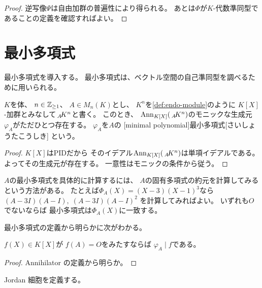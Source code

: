 \documentclass[report]{jlreq}
\begin{document}
\begin{proof}
    逆写像$\Psi$は自由加群の普遍性により得られる。
    あとは$\Phi$が$K$-代数準同型であることの定義を確認すればよい。
    \TODO{}
\end{proof}

%
\section{最小多項式}

最小多項式を導入する。
最小多項式は、ベクトル空間の自己準同型を調べるために用いられる。

\begin{propdef}[最小多項式]
    $K$を体、
    $n \in \mathbb{Z}_{\ge 1}$、
    $A \in M_n(K)$とし、
    $K^n$を\cref{def:endo-module}のように
    $K[X]$-加群とみなして$\,{}_{A}\!K^n$と書く。
    このとき、
    $\operatorname{Ann}_{K[X]}(\,{}_{A}\!K^n)$のモニックな生成元$\varphi_A$がただひとつ存在する。
    $\varphi_A$を$A$の
    [minimal polynomial]{最小多項式}[さいしょうたこうしき]
    という。
\end{propdef}

\begin{proof}
    $K[X]$はPIDだから
    そのイデアル$\operatorname{Ann}_{K[X]}(\,{}_{A}\!K^n)$は単項イデアルである。
    よってその生成元が存在する。
    一意性はモニックの条件から従う。
\end{proof}

\begin{example}[最小多項式の計算]
    $A$の最小多項式を具体的に計算するには、
    $A$の固有多項式の約元を計算してみるという方法がある。
    たとえば$\Phi_A(X) = (X - 3)(X - 1)^3$なら
    $(A - 3I)(A - I), \; (A - 3I)(A - I)^2$
    を計算してみればよい。
    いずれも$O$でないならば
    最小多項式は$\Phi_A(X)$に一致する。
\end{example}

最小多項式の定義から明らかに次がわかる。

\begin{proposition}
    $f(X) \in K[X]$が
    $f(A) = O$をみたすならば
    $\varphi_A \mid f$である。
\end{proposition}

\begin{proof}
    Annihilator の定義から明らか。
\end{proof}

Jordan 細胞を定義する。
\end{document}
